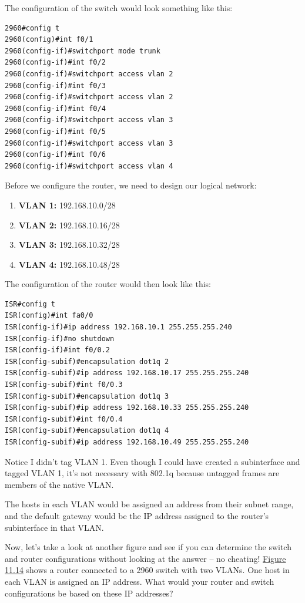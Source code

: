The configuration of the switch would look something like this:

\begin{verbatim}
2960#config t
2960(config)#int f0/1
2960(config-if)#switchport mode trunk
2960(config-if)#int f0/2
2960(config-if)#switchport access vlan 2
2960(config-if)#int f0/3
2960(config-if)#switchport access vlan 2
2960(config-if)#int f0/4
2960(config-if)#switchport access vlan 3
2960(config-if)#int f0/5
2960(config-if)#switchport access vlan 3
2960(config-if)#int f0/6
2960(config-if)#switchport access vlan 4
\end{verbatim}

Before we configure the router, we need to design our logical network:

\begin{enumerate}
\tightlist
\item
  \textbf{VLAN 1:} 192.168.10.0/28
\item
  \textbf{VLAN 2:} 192.168.10.16/28
\item
  \textbf{VLAN 3:} 192.168.10.32/28
\item
  \textbf{VLAN 4:} 192.168.10.48/28
\end{enumerate}

The configuration of the router would then look like this:

\begin{verbatim}
ISR#config t
ISR(config)#int fa0/0
ISR(config-if)#ip address 192.168.10.1 255.255.255.240
ISR(config-if)#no shutdown
ISR(config-if)#int f0/0.2
ISR(config-subif)#encapsulation dot1q 2
ISR(config-subif)#ip address 192.168.10.17 255.255.255.240
ISR(config-subif)#int f0/0.3
ISR(config-subif)#encapsulation dot1q 3
ISR(config-subif)#ip address 192.168.10.33 255.255.255.240
ISR(config-subif)#int f0/0.4
ISR(config-subif)#encapsulation dot1q 4
ISR(config-subif)#ip address 192.168.10.49 255.255.255.240
\end{verbatim}

Notice I didn't tag VLAN 1. Even though I could have created a
subinterface and tagged VLAN 1, it's not necessary with 802.1q because
untagged frames are members of the native VLAN.

The hosts in each VLAN would be assigned an address from their subnet
range, and the default gateway would be the IP address assigned to the
router's subinterface in that VLAN.

Now, let's take a look at another figure and see if you can determine
the switch and router configurations without looking at the answer -- no
cheating! \protect\hyperlink{c11.xhtmlux5cux23figure11-14}{Figure 11.14}
shows a router connected to a 2960 switch with two VLANs. One host in
each VLAN is assigned
an IP address. What
would your router and switch configurations be based on these IP
addresses?

